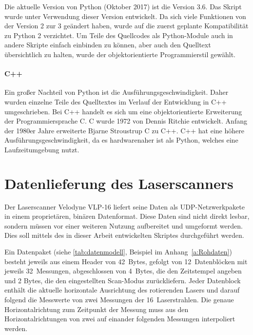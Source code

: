\documentclass[a4paper,12pt,bibliography=totoc, listof=totoc,titlepage,pointlessnumbers]{scrreprt}
\begin{document}
Die aktuelle Version von Python (Oktober 2017) ist die Version 3.6. Das Skript wurde unter Verwendung dieser Version entwickelt. Da sich viele Funktionen von der Version 2 zur 3 geändert haben, wurde auf die zuerst geplante Kompatibilität zu Python 2 verzichtet. Um Teile des Quellcodes als Python-Module auch in andere Skripte einfach einbinden zu können, aber auch den Quelltext übersichtlich zu halten, wurde der objektorientierte Programmierstil gewählt.

\paragraph{C++}
Ein großer Nachteil von Python ist die Aus\-füh\-rungs\-ge\-schwin\-dig\-keit. Daher wurden einzelne Teile des Quelltextes im Verlauf der Entwicklung in C++ umgeschrieben.
Bei C++ handelt es sich um eine objektorientierte Erweiterung der Programmiersprache C. C wurde 1972 von Dennis Ritchie entwickelt. Anfang der 1980er Jahre erweiterte Bjarne Stroustrup C zu C++. C++ hat eine höhere Aus\-füh\-rungs\-ge\-schwin\-dig\-keit, da es hardwarenaher ist als Python, welches eine Laufzeitumgebung nutzt. \citep[S. 4f]{cpp}


\section{Datenlieferung des Laser\-scan\-ners}
\label{ss:Datenlieferung}
Der Laser\-scan\-ner Velodyne VLP-16 liefert seine Daten als UDP-Netzwerkpakete in einem proprietären, binären Datenformat. Diese Daten sind nicht direkt lesbar, sondern müssen vor einer weiteren Nutzung aufbereitet und umgeformt werden. Dies soll mittels des in dieser Arbeit entwickelten Skriptes durchgeführt werden.

Ein Datenpaket (siehe \autoref{tab:datenmodell}, Beispiel im Anhang~\ref{a:Rohdaten}) besteht jeweils aus einem Header von 42~Bytes, gefolgt von 12~Datenblöcken mit jeweils 32~Messungen, abgeschlossen von 4~Bytes, die den Zeitstempel angeben und 2 Bytes, die den eingestellten Scan-Modus zurückliefern. Jeder Datenblock enthält die aktuelle horizontale Ausrichtung des rotierenden Lasers und darauf folgend die Messwerte von zwei Messungen der 16~Laserstrahlen. Die genaue Horizontalrichtung zum Zeitpunkt der Messung muss aus den Horizontalrichtungen von zwei auf einander folgenden Messungen interpoliert werden.
\end{document}
